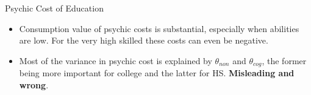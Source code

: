 \documentclass{beamer}
\begin{document}
\begin{frame}{Psychic Cost of Education}
\begin{itemize}
\item Consumption value of psychic costs is substantial, especially when abilities are low. For the very high skilled these costs can even be negative.

\item Most of the variance in psychic cost is explained by $\theta_{non}$ and $\theta_{cog}$, the former being more important for college and the latter for HS. \textbf{Misleading and wrong}. %


\end{itemize}
\end{frame}


\end{document}
